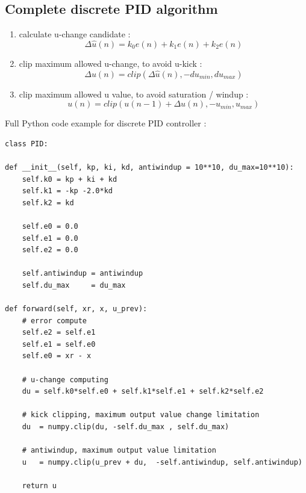 \documentclass[12pt,twoside,onecolumn,openany,extrafontsizes,dvipsnames]{memoir}
\begin{document}
                \newpage
                \subsection{Complete discrete PID algorithm}  
        
                    \begin{enumerate}
                    \item  calculate u-change candidate :
                        $$\Delta \hat{u}(n) = k_0e(n) + k_1e(n) + k_2e(n)$$
                    
                    \item clip maximum allowed u-change, to avoid u-kick :
                        $$\Delta u(n) = clip(\Delta \hat{u}(n), -du_{min}, du_{max})$$
                
                    \item clip maximum allowed u value, to avoid saturation / windup :
                        $$u(n) = clip(u(n-1) + \Delta u(n), -u_{min}, u_{max})$$
                    \end{enumerate}

                    Full Python code example for discrete PID controller :
                    \begin{lstlisting}[style=python_style]
class PID:

def __init__(self, kp, ki, kd, antiwindup = 10**10, du_max=10**10):
    self.k0 = kp + ki + kd
    self.k1 = -kp -2.0*kd
    self.k2 = kd

    self.e0 = 0.0
    self.e1 = 0.0
    self.e2 = 0.0
    
    self.antiwindup = antiwindup
    self.du_max     = du_max

def forward(self, xr, x, u_prev):
    # error compute
    self.e2 = self.e1
    self.e1 = self.e0
    self.e0 = xr - x

    # u-change computing
    du = self.k0*self.e0 + self.k1*self.e1 + self.k2*self.e2

    # kick clipping, maximum output value change limitation
    du  = numpy.clip(du, -self.du_max , self.du_max)

    # antiwindup, maximum output value limitation
    u   = numpy.clip(u_prev + du,  -self.antiwindup, self.antiwindup)

    return u
                    \end{lstlisting}
\end{document}
